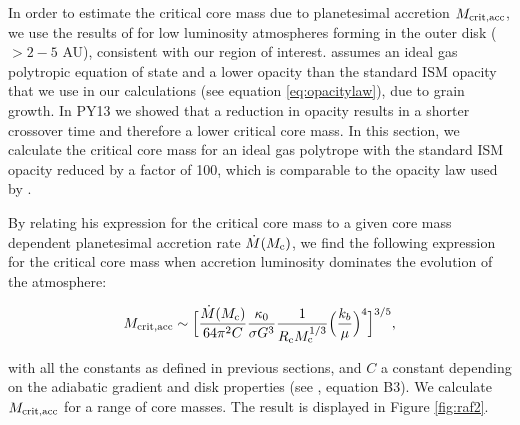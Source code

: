 \documentclass[apj]{emulateapj}
\newcommand{\co}{_{\rm c}}
\begin{document}


In order to estimate the critical core mass due to planetesimal accretion $M_{\rm{crit,acc}}$, we use the results of \citet{rafikov06} for low luminosity atmospheres forming in the outer disk ($>2-5$ AU), consistent with our region of interest. \citet{rafikov06} assumes an ideal gas polytropic equation of state and a lower opacity than the standard ISM opacity that we use in our calculations (see equation \ref{eq:opacitylaw}), due to grain growth. In PY13 we showed that a reduction in opacity results in a shorter crossover time and therefore a lower critical core mass. In this section, we calculate the critical core mass for an ideal gas polytrope with the standard ISM opacity reduced by a factor of 100, which is comparable to the opacity law used by \citet{rafikov06}. 

By relating his expression for the critical core mass to a given core mass dependent planetesimal accretion rate $\dot{M}(M_{\rm{c}})$, we find the following expression for the critical core mass when accretion luminosity dominates the evolution of the atmosphere:

\begin{equation}
\label{eq:critraf}
M_{\rm{crit, acc}} \sim \Big[\frac{\dot{M}(M_{\rm{c}})}{64 \pi^2 C} \frac{\kappa_0}{\sigma G^3} \frac{1}{R\co M\co^{1/3}} \Big(\frac{k_b}{\mu}\Big)^4\Big]^{3/5},
\end{equation}

\noindent with all the constants as defined in previous sections, and $C$ a constant depending on the adiabatic gradient and disk properties (see \citealt{rafikov06}, equation B3). We calculate $M_{\rm{crit,acc}}$ for a range of core masses. The result is displayed in Figure \ref{fig:raf2}. 
\end{document}
